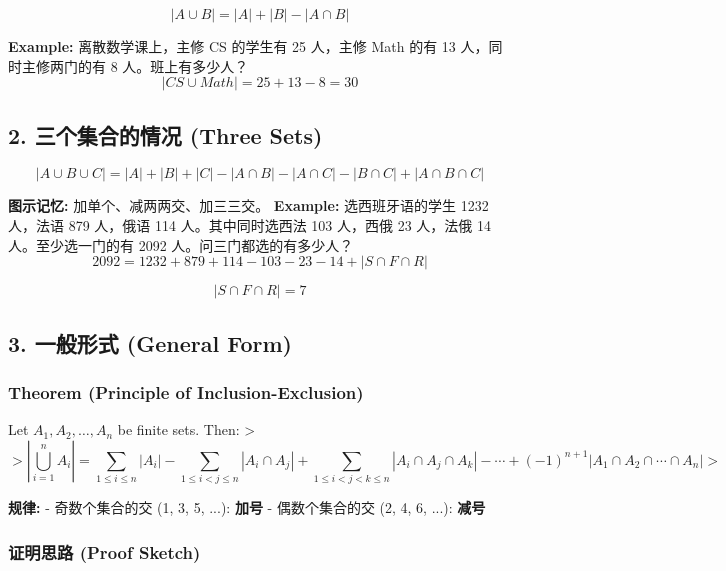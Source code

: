 \documentclass[10pt,a4paper,openany]{ctexbook}
\theoremstyle{definition}
\theoremstyle{remark}
\renewenvironment{quote}
  {\list{}{\leftmargin=1em\rightmargin=0pt\topsep=0.5pt\partopsep=0pt}\item[]}
  {\endlist}
\begin{document}
\[
|A \cup B| = |A| + |B| - |A \cap B|
\]

\textbf{Example:} 离散数学课上，主修 CS 的学生有 25 人，主修 Math 的有 13 人，同时主修两门的有 8 人。班上有多少人？
\[
|CS \cup Math| = 25 + 13 - 8 = 30
\]

\vspace{-2pt}

\subsection{2. 三个集合的情况 (Three Sets)}

\[
|A \cup B \cup C| = |A| + |B| + |C| - |A \cap B| - |A \cap C| - |B \cap C| + |A \cap B \cap C|
\]

\textbf{图示记忆:} 加单个、减两两交、加三三交。
\textbf{Example:} 选西班牙语的学生 1232 人，法语 879 人，俄语 114 人。其中同时选西法 103 人，西俄 23 人，法俄 14 人。至少选一门的有 2092 人。问三门都选的有多少人？
\[
2092 = 1232 + 879 + 114 - 103 - 23 - 14 + |S \cap F \cap R|
\]

\[
|S \cap F \cap R| = 7
\]

\vspace{-2pt}

\subsection{3. 一般形式 (General Form)}

\subsubsection{Theorem (Principle of Inclusion-Exclusion)}

\begin{quote}
Let $A_1, A_2, \dots, A_n$ be finite sets. Then:
>
\[
> \left| \bigcup_{i=1}^n A_i \right| = \sum_{1 \le i \le n} |A_i| - \sum_{1 \le i < j \le n} |A_i \cap A_j| + \sum_{1 \le i < j < k \le n} |A_i \cap A_j \cap A_k| - \cdots + (-1)^{n+1} |A_1 \cap A_2 \cap \cdots \cap A_n|
> 
\]


\textbf{规律:}
- 奇数个集合的交 (1, 3, 5, ...): \textbf{加号}
- 偶数个集合的交 (2, 4, 6, ...): \textbf{减号}

\end{quote}

\subsubsection{证明思路 (Proof Sketch)}
\end{document}
